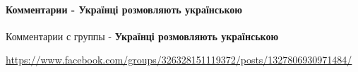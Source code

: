  
 
 
 
 
\paragraph{Комментарии - Українці розмовляють українською}
\label{sec:24_07_2021.fb.malanjuk_lesja.1.ukrainizacia_sebja.cmt.1}

Комментарии с группы - {\bfseries Українці розмовляють українською}\par
\url{https://www.facebook.com/groups/326328151119372/posts/1327806930971484/}

